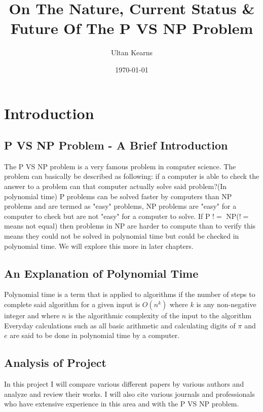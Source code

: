 \documentclass{report}
\title{On The Nature, Current Status \& Future Of The P VS NP Problem}
\author{Ultan Kearns}
\date{\today}
\begin{document}
\maketitle
\tableofcontents
\chapter{Introduction}
\section{P VS NP Problem - A Brief Introduction}
The P VS NP problem is a very famous problem in computer science.  The problem
can basically be described as following: if a computer is able to check the answer
to a problem can that computer actually solve said problem?(In polynomial time)\cite{pvsnpmit}  P problems can be
solved faster by computers than NP problems and are termed as "easy" problems, NP problems
are "easy" for a computer to check but are not "easy" for a computer to solve.\cite{pvsnpmit}
If P $!=$ NP($!=$ means not equal) then problems in NP are harder to compute than to verify
this means they could not be solved in polynomial time but could be checked in polynomial time.  We will explore this more in later chapters.
\section{An Explanation of Polynomial Time}
Polynomial time is a term that is applied to algorithms if the number of steps
to complete said algorithm for a given input is $O(n^k)$ where $k$ is any non-negative
integer and where $n$ is the algorithmic complexity of the input to the algorithm \cite{polynomial}
Everyday calculations such as all basic arithmetic and calculating digits of $\pi$ and $e$ are said
to be done in polynomial time by a computer\cite{polynomial}.
\section{Analysis of Project}
In this project I will compare various different papers by various authors and
analyze and review their works.  I will also cite various journals and professionals
who have extensive experience in this area and with the P VS NP problem.
\end{document}

